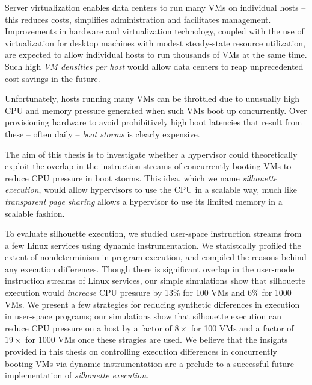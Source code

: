 % 
% 
%
Server virtualization enables data centers to run many VMs on individual hosts -- 
this reduces costs, simplifies administration and facilitates management.
Improvements in hardware and virtualization technology,
coupled with the use of virtualization for desktop machines with modest 
steady-state resource utilization, are expected to allow
individual hosts to run thousands of VMs at the same time.
Such high {\em VM densities per host} would allow data centers
to reap unprecedented cost-savings in the future.

Unfortunately, hosts running many VMs 
can be throttled due to unusually high CPU and
memory pressure generated when such VMs 
boot up concurrently. Over provisioning hardware
to avoid prohibitively high boot latencies that result from
these -- often daily -- {\em boot storms} 
is clearly expensive.

The aim of this thesis is to investigate whether a hypervisor could theoretically exploit the overlap in 
the instruction streams of concurrently booting VMs to reduce CPU pressure in boot storms. 
This idea, which we name {\em silhouette execution}, would allow hypervisors
to use the CPU in a scalable way, much like {\em transparent page sharing}
allows a hypervisor to use its limited memory in a scalable fashion.

To evaluate silhouette execution, we studied user-space
instruction streams from a few Linux services using dynamic instrumentation.
We statistcally profiled the extent of nondeterminism in program execution, and   
compiled the reasons behind any execution differences.
Though there is significant overlap in the user-mode instruction streams
of Linux services, our simple simulations show that silhouette
execution would {\em increase} CPU pressure by 13\% for 100 VMs and 6\% for 1000 VMs.
We present a few strategies for reducing synthetic differences in execution in user-space
programs; our simulations show that silhouette execution can reduce CPU pressure on a host by a factor
of $8\times$ for 100 VMs and a factor of $19\times$ for 1000
VMs once these stragies are used. We believe that the insights provided in this thesis on controlling
execution differences in concurrently booting VMs via
dynamic instrumentation are a prelude to a successful future implementation of {\em silhouette execution}.




